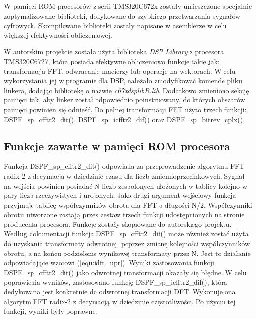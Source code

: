 
W pamięci ROM procesorów z serii TMS320C672x zostały umieszczone specjalnie zoptymalizowane biblioteki, dedykowane do szybkiego przetwarzania sygnałów cyfrowych. Skompilowane biblioteki zostały napisane w asemblerze w celu większej efektywności obliczeniowej. 

W autorskim projekcie została użyta biblioteka \emph{DSP Library} z procesora TMS320C6727, która posiada efektywne obliczeniowo funkcje takie jak: transformacja FFT, odwracanie macierzy lub operacje na wektorach. W celu wykorzystania jej w programie dla DSP, należało zmodyfikować komende pliku linkera, dodając bibliotekę o nazwie \emph{c67xdsplibR.lib}. Dodatkowo zmieniono sekcję pamięci tak, aby linker został odpowiednio poinstruowany, do których obszarów pamięci powinien się odnieść. Do pełnej transformacji FFT użyto trzech funkcji: DSPF\_sp\_cfftr2\_dit(), DSPF\_sp\_icfftr2\_dif() oraz DSPF\_sp\_bitrev\_cplx().

\subsection{Funkcje zawarte w pamięci ROM procesora}
Funkcja DSPF\_sp\_cfftr2\_dit() odpowiada za przeprowadzenie algorytmu FFT radix-2 z decymacją w dziedzinie czasu dla liczb zmiennoprzecinkowych. Sygnał na wejściu powinien posiadać N liczb zespolonych ułożonych w tablicy kolejno w pary liczb rzeczywistych i urojonych. Jako drugi argument wejściowy funkcja przyjmuje tablicę współczynników obrotu dla FFT o długości N/2. Współczynniki obrotu utworzone zostają przez zestaw trzech funkcji udostępnionych na stronie producenta procesora. Funkcje zostały skopiowane do autorskiego projektu. %
Według dokumentacji funkcja DSPF\_sp\_cfftr2\_dit() może również zostać użyta do uzyskania transformaty odwrotnej, poprzez zmianę kolejności współczynników obrotu, a na końcu podzielenie wynikowej transformaty przez N. Jest to działanie odpowiadające wzorowi (\ref{equ:idft_upr}). Wyniki zastosowania funkcji DSPF\_sp\_cfftr2\_dit() jako odwrotnej transformacji okazały się błędne. W celu poprawienia wyników, zastosowano funkcję DSPF\_sp\_icfftr2\_dif(), która dedykowana jest konkretnie do odwrotnej transformacji DFT. Wykonuje ona algorytm FFT radix-2 z decymacją w dziedzinie częstotliwości. Po użyciu tej funkcji, wyniki były poprawne.

